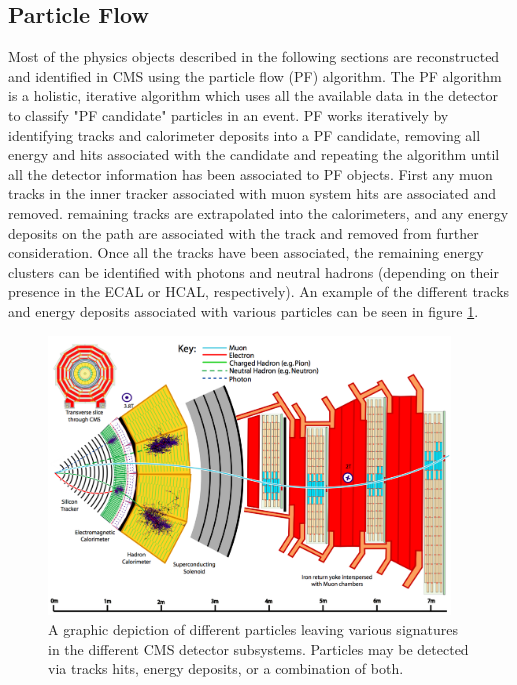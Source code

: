 \subsection{Particle Flow}
\label{subsec:pf}
Most of the physics objects described in the following sections are reconstructed and identified in CMS using the particle flow (PF) algorithm. The PF algorithm is a holistic, iterative algorithm which uses all the available data in the detector to classify "PF candidate" particles in an event. PF works iteratively by identifying tracks and calorimeter deposits into a PF candidate, removing all energy and hits associated with the candidate and repeating the algorithm until all the detector information has been associated to PF objects. First any muon tracks in the inner tracker associated with muon system hits are associated and removed. remaining tracks are extrapolated into the calorimeters, and any energy deposits on the path are associated with the track and removed from further consideration. Once all the tracks have been associated, the remaining energy clusters can be identified with photons and neutral hadrons (depending on their presence in the ECAL or HCAL, respectively). An example of the different tracks and energy deposits associated with various particles can be seen in figure \ref{fig:pfCandidates}.
\begin{figure}
	\centering
	\includegraphics[width=0.95\textwidth]{detector/figs/CMS_Slice_2}
	\caption{A graphic depiction of different particles leaving various signatures in the different CMS detector subsystems. Particles may be detected via tracks hits, energy deposits, or a combination of both.}
	\label{fig:pfCandidates}
\end{figure}

